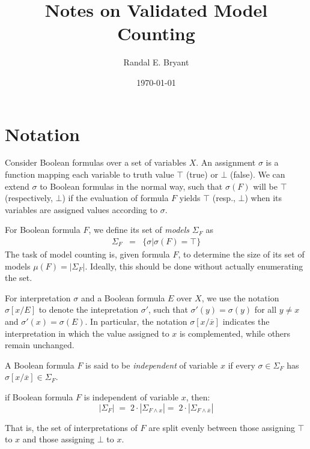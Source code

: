 \documentclass{llncs}
\title{Notes on Validated Model Counting}
\author{Randal E. Bryant}
\institute{
Computer Science Department \\
Carnegie Mellon University, Pittsburgh, PA, United States
}
\date{\today}
\newcommand{\tautology}{\top}
\newcommand{\nil}{\bot}
\newcommand{\obar}[1]{\overline{#1}}
\newcommand{\interp}{\sigma}
\newcommand{\interpset}[1]{\Sigma_{#1}}
\newcommand{\mcount}{\mu}
\newcommand{\subs}[2]{[#1/#2]}
\newcommand{\subsflip}[1]{\subs{#1}{\obar{#1}}}
\begin{document}
\maketitle

\section{Notation}

Consider Boolean formulas over a set of variables $X$.  An
assignment $\interp$ is a function mapping each variable to 
truth value $\tautology$ (true) or $\nil$ (false).  We can extend
$\interp$ to Boolean formulas in the normal way, such that
$\interp(F)$ will be $\tautology$ (respectively, $\nil$) if the
evaluation of formula $F$ yields $\tautology$ (resp., $\nil$) when its
variables are assigned values according to $\interp$.

For Boolean formula $F$, we define its set of {\em models} $\interpset{F}$ as
\begin{eqnarray}
\interpset{F} & = & \{ \interp | \interp(F) = \tautology \}
\end{eqnarray}
The task of model counting is, given formula $F$, to determine the size of its set of models
$\mcount(F) = |\interpset{F}|$.  Ideally, this should be done without actually enumerating the set.

For interpretation $\interp$ and a Boolean formula $E$ over $X$, we
use the notation $\interp\subs{x}{E}$ to denote the intepretation
$\interp'$, such that $\interp'(y) = \interp(y)$ for all $y \not = x$
and $\interp'(x) = \interp(E)$.  In particular, the notation
$\interp\subsflip{x}$ indicates the interpretation in which the value
assigned to $x$ is complemented, while others remain unchanged.

A Boolean formula $F$ is said to be {\em independent} of variable $x$
if every $\interp \in \interpset{F}$ has $\interp\subsflip{x} \in
\interpset{F}$.

\begin{lemma}
\label{lemma:independent}
if Boolean formula $F$ is independent of variable $x$, then:
\begin{equation}
|\interpset{F}| \; = \; 2\cdot |\interpset{F\land x}| = \; 2\cdot |\interpset{F\land \obar{x}}| \label{eqn:independent}
\end{equation}  
\end{lemma}  
That is, the set of interpretations of $F$ are split evenly between
those assigning $\tautology$ to $x$ and those assigning $\nil$ to $x$.
\end{document}
